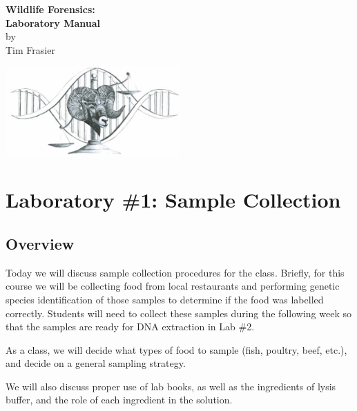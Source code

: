 \documentclass[12pt, hidelinks]{article}
\begin{document}
\vspace*{2cm}

	\begin{center}
		\LARGE{\textbf{Wildlife Forensics:\\
		\vspace{0.5cm}
		 Laboratory Manual}}\normalsize{}\\
		
		\vspace{2cm}
		by\\
		Tim Frasier\\
		
		\vspace{2cm}
		
		\includegraphics[width=0.5\textwidth]{figures/swfs.jpg}
	\end{center}


\newpage
\section{Laboratory \#1: Sample Collection}


	\subsection{Overview}
	Today we will discuss sample collection procedures for the class. Briefly, for this course we will be collecting food from local restaurants and performing genetic species identification of those samples to determine if the food was labelled correctly. Students will need to collect these samples during the following week so that the samples are ready for DNA extraction in Lab \#2.

 	As a class, we will decide what types of food to sample (fish, poultry, beef, etc.), and decide on a general sampling strategy.
	
	We will also discuss proper use of lab books, as well as the ingredients of lysis buffer, and the role of each ingredient in the solution.
	
\end{document}
